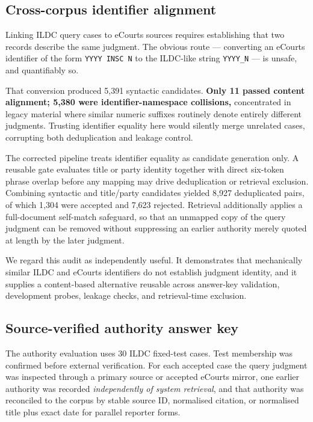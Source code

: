 \documentclass[conference]{IEEEtran}
\begin{document}
\subsection{Cross-corpus identifier alignment}
\label{sec:alignment}

Linking ILDC query cases to eCourts sources requires establishing that two
records describe the same judgment. The obvious route --- converting an eCourts
identifier of the form \texttt{YYYY INSC N} to the ILDC-like string
\texttt{YYYY\_N} --- is unsafe, and quantifiably so.

That conversion produced 5{,}391 syntactic candidates. \textbf{Only 11 passed
content alignment; 5{,}380 were identifier-namespace collisions,} concentrated
in legacy material where similar numeric suffixes routinely denote entirely
different judgments. Trusting identifier equality here would silently merge
unrelated cases, corrupting both deduplication and leakage control.

The corrected pipeline treats identifier equality as candidate generation only.
A reusable gate evaluates title or party identity together with direct six-token
phrase overlap before any mapping may drive deduplication or retrieval
exclusion. Combining syntactic and title/party candidates yielded 8{,}927
deduplicated pairs, of which 1{,}304 were accepted and 7{,}623 rejected.
Retrieval additionally applies a full-document self-match safeguard, so that an
unmapped copy of the query judgment can be removed without suppressing an
earlier authority merely quoted at length by the later judgment.

We regard this audit as independently useful. It demonstrates that mechanically
similar ILDC and eCourts identifiers do not establish judgment identity, and it
supplies a content-based alternative reusable across answer-key validation,
development probes, leakage checks, and retrieval-time exclusion.

\subsection{Source-verified authority answer key}

The authority evaluation uses 30 ILDC fixed-test cases. Test membership was
confirmed before external verification. For each accepted case the query
judgment was inspected through a primary source or accepted eCourts mirror, one
earlier authority was recorded \emph{independently of system retrieval}, and
that authority was reconciled to the corpus by stable source ID, normalised
citation, or normalised title plus exact date for parallel reporter forms.
\end{document}

